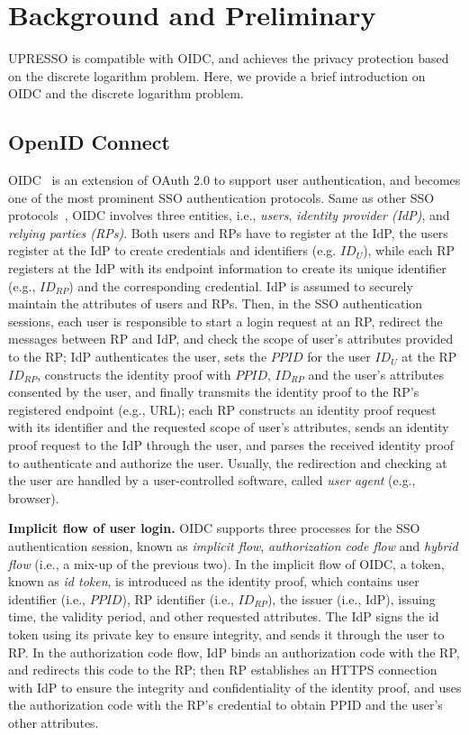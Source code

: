 \section{Background and Preliminary}
\label{sec:background}
UPRESSO is compatible with OIDC, and achieves the privacy protection based on the discrete logarithm problem.
Here, we provide a brief introduction on OIDC and the discrete logarithm problem.

\subsection{OpenID Connect}
\label{subsec:OIDC}
OIDC~\cite{OpenIDConnect} is an extension of OAuth 2.0 to support user authentication,
 and becomes one of the most prominent SSO authentication protocols.
Same as other SSO protocols~\cite{SAMLIdentifier}, OIDC involves three entities, i.e., {\em users}, {\em identity provider (IdP)}, and {\em relying parties (RPs)}.
Both users and RPs have to register at the IdP,
the users register at the IdP to create credentials and identifiers (e.g. $ID_U$),
while each RP registers at the IdP with its endpoint information to create its unique identifier (e.g., $ID_{RP}$) and the corresponding credential.
IdP is assumed to securely maintain the attributes  of users and RPs.
Then, in the SSO authentication sessions,
 each user is responsible to start a login request at an RP, redirect the messages between RP and IdP, and check the scope of user's attributes provided to the RP;
 IdP authenticates the user, sets the $PPID$ for the user $ID_U$ at the RP $ID_{RP}$,
 constructs the identity proof with  $PPID$, $ID_{RP}$ and the user's attributes consented by the user, and finally transmits the identity proof to the RP's registered endpoint (e.g., URL);
 each RP constructs an identity proof request with its identifier and the requested scope of  user's attributes, sends an identity proof request to the IdP through the user, and parses the received identity proof to authenticate and authorize the user.
Usually, the redirection and checking at the user are handled by a user-controlled software, called {\em user agent} (e.g., browser).



\noindent\textbf{Implicit flow of user login.}
OIDC supports three processes for the SSO authentication session, known as {\em implicit flow}, {\em authorization code flow} and {\em hybrid flow} (i.e., a mix-up of the previous two).
In the implicit flow of OIDC, a token, known as {\em id token}, is introduced as the identity proof, which contains user identifier (i.e., $PPID$), RP identifier (i.e., $ID_{RP}$), the issuer (i.e., IdP), issuing time, the validity period, and other requested attributes. The IdP signs the id token using its private key to ensure integrity, and sends it through the user to RP.
In the authorization code flow, IdP binds an authorization code with the RP, and redirects this code to the RP;
 then RP establishes an HTTPS connection with IdP to ensure the integrity and confidentiality of the identity proof, and  uses the authorization code with the RP's credential to obtain PPID and the user's other  attributes.

